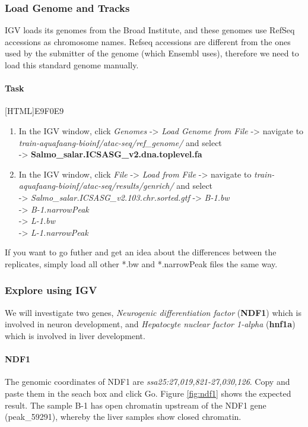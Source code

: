 \documentclass[12pt]{article}
\begin{document}
		\subsubsection{Load Genome and Tracks}
			IGV loads its genomes from the Broad Institute, and these genomes use RefSeq accessions as chromosome names. 
			Refseq accessions are different from the ones used by the submitter of the genome (which Ensembl uses), therefore we need to load this standard genome manually.
			
			\paragraph{Task}
			
				[HTML]{E9F0E9}{\parbox{\linewidth}{%
					\begin{enumerate}
						\item In the IGV window, click \textit{Genomes} -> \textit{Load Genome from File} -> navigate to  \textit{train-aquafaang-bioinf/atac-seq/ref\_genome/} and select \\
						-> \textbf{Salmo\_salar.ICSASG\_v2.dna.toplevel.fa} 
						\item In the IGV window, click \textit{File} -> \textit{Load from File} -> navigate to \textit{train-aquafaang-bioinf/atac-seq/results/genrich/} and select\\
						-> \textit{Salmo\_salar.ICSASG\_v2.103.chr.sorted.gtf}
						-> \textit{B-1.bw} \\
						-> \textit{B-1.narrowPeak} \\
						-> \textit{L-1.bw} \\
						-> \textit{L-1.narrowPeak}
					\end{enumerate}
				}}
		
		If you want to go futher and  get an idea about the differences between the replicates, simply load all other *.bw and *.narrowPeak files the same way.
		
		\subsubsection{Explore using IGV}
			We will investigate two genes, \textit{Neurogenic differentiation factor} (\textbf{NDF1}) which is involved in neuron development, and \textit{Hepatocyte nuclear factor 1-alpha} (\textbf{hnf1a}) which is involved in liver development. 
			
			\paragraph{NDF1}
			The genomic coordinates of NDF1 are  \textit{ssa25:27,019,821-27,030,126}. Copy and paste them in the seach box and click Go. 
			Figure \ref{fig:ndf1} shows the expected result. 
			The sample B-1 has open chromatin upstream of the NDF1 gene (peak\_59291), whereby the liver samples show closed chromatin.   
			
\end{document}
